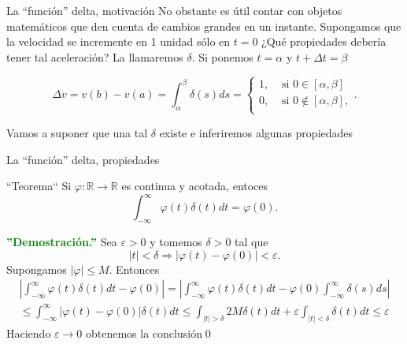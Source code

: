 \documentclass[xcolor=dvipsnames,a4paper,10pt,handout]{beamer}
\renewcommand{\textbf}[1]{\textcolor{green}{\bfseries #1}}
\begin{document}
\begin{frame}{La ``función'' delta, motivación }
No obstante es útil contar con objetos matemáticos que den cuenta de cambios grandes en un instante. Supongamos que la velocidad se incremente en 1 unidad sólo en $t=0$ ¿Qué propiedades debería tener tal aceleración? La llamaremos $\delta$. Si ponemos $t=\alpha$ y $t+\Delta t=\beta$

  $$\Delta v=v(b)-v(a)=\int_{\alpha}^{\beta}\delta(s)ds
  =\left\{ 
        \begin{array}{cc}
         1,  &\text{ si }  0\in [\alpha,\beta]\\
         0,  &\text{ si }  0\notin  [\alpha,\beta],\\ 
        \end{array}
      \right.   
.$$

Vamos a suponer que una tal $\delta$ existe e inferiremos algunas propiedades

\end{frame}




\begin{frame}{La ``función'' delta, propiedades }
 
\begin{block}{``Teorema``}
 Si $\varphi:\mathbb{R}\to\mathbb{R}$ es continua y acotada, entoces
 \[
  \int_{-\infty}^{\infty}\varphi(t)\delta(t)dt=\varphi(0).
 \]

\end{block}

 \textbf{''Demostración.''} Sea $\varepsilon>0$  y tomemos $\delta>0$  tal que 
 \[
  |t|<\delta\Rightarrow |\varphi(t)-\varphi(0)|<\varepsilon.
 \]
 Supongamos  $|\varphi|\leq M$. Entonces 
  \begin{multline*}
  \left|\int_{-\infty}^{\infty}\varphi(t)\delta(t)dt-\varphi(0)\right|=
  \left|\int_{-\infty}^{\infty}\varphi(t)\delta(t)dt-\varphi(0)\int_{-\infty}^{\infty}\delta(s)ds\right|\\
  \leq  \int_{-\infty}^{\infty}\left|\varphi(t)-\varphi(0)\right| \delta(t)dt\leq 
  \int_{|t|>\delta} 2M\delta(t)dt+\varepsilon\int_{|t|<\delta}\delta(t)dt\leq\varepsilon
   \end{multline*}
Haciendo $\varepsilon\to 0$ obtenemos la conclusión\qed
  
 

\end{frame}
\end{document}
